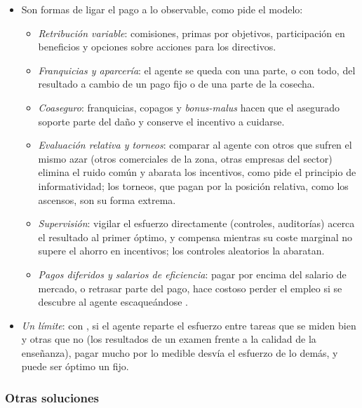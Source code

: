 \documentclass[11pt]{article}
\begin{document}
\begin{itemize}
\item Son formas de ligar el pago a lo observable, como pide el modelo:
  \begin{itemize}
  \item \emph{Retribución variable}: comisiones, primas por objetivos, participación en beneficios y opciones sobre acciones para los directivos.
  \item \emph{Franquicias y aparcería}: el agente se queda con una parte, o con todo, del resultado a cambio de un pago fijo o de una parte de la cosecha\nocite{Stiglitz1974Incentives}.
  \item \emph{Coaseguro}: franquicias, copagos y \emph{bonus-malus} hacen que el asegurado soporte parte del daño y conserve el incentivo a cuidarse.
  \item \emph{Evaluación relativa y torneos}: comparar al agente con otros que sufren el mismo azar (otros comerciales de la zona, otras empresas del sector) elimina el ruido común y abarata los incentivos, como pide el principio de informatividad; los torneos, que pagan por la posición relativa, como los ascensos, son su forma extrema\nocite{LazearRosen1981Rank}.
  \item \emph{Supervisión}: vigilar el esfuerzo directamente (controles, auditorías) acerca el resultado al primer óptimo, y compensa mientras su coste marginal no supere el ahorro en incentivos; los controles aleatorios la abaratan.
  \item \emph{Pagos diferidos y salarios de eficiencia}: pagar por encima del salario de mercado, o retrasar parte del pago, hace costoso perder el empleo si se descubre al agente escaqueándose\nocite{ShapiroStiglitz1984Equilibrium} .
  \end{itemize}
\item \emph{Un límite}: con , si el agente reparte el esfuerzo entre tareas que se miden bien y otras que no (los resultados de un examen frente a la calidad de la enseñanza), pagar mucho por lo medible desvía el esfuerzo de lo demás, y puede ser óptimo un fijo\nocite{HolmstromMilgrom1991Multitask}.
\end{itemize}

\subsubsection{Otras soluciones}\label{sec:otras-soluciones-rm}
\end{document}
